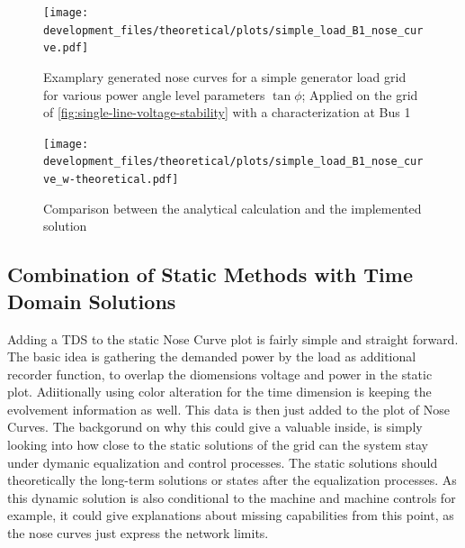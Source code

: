 \begin{figure}[htbp!]
        \centering
        \texttt{[image: development\_files/theoretical/plots/simple\_load\_B1\_nose\_curve.pdf]}
        \caption[Examplary generated nose curve for a simple generator - load grid]{Examplary generated nose curves for a simple generator load grid for various power angle level parameters $\tan \phi$; Applied on the grid of \autoref{fig:single-line-voltage-stability} with a characterization at Bus 1}
        \label{fig:nose-curve-simple-grid}
\end{figure}

\begin{figure}[htbp!]
        \centering
        \texttt{[image: development\_files/theoretical/plots/simple\_load\_B1\_nose\_curve\_w-theoretical.pdf]}
        \caption[Comparison between the analytical calculation and the implemented solution]{Comparison between the analytical calculation and the implemented solution}
        \label{fig:nose-curve-simple-comp}
\end{figure}


\subsection{Combination of Static Methods with Time Domain Solutions}
\label{sec:comb-time-dimension}

Adding a \acs{TDS} to the static Nose Curve plot is fairly simple and straight forward.
The basic idea is gathering the demanded power by the load as additional recorder function, to overlap the diomensions voltage and power in the static plot.
Adiitionally using color alteration for the time dimension is keeping the evolvement information as well.
This data is then just added to the plot of Nose Curves.
The backgorund on why this could give a valuable inside, is simply looking into how close to the static solutions of the grid can the system stay under dymanic equalization and control processes.
The static solutions should theoretically the long-term solutions or states after the equalization processes.
As this dynamic solution is also conditional to the machine and machine controls for example, it could give explanations about missing capabilities from this point, as the nose curves just express the network limits.

